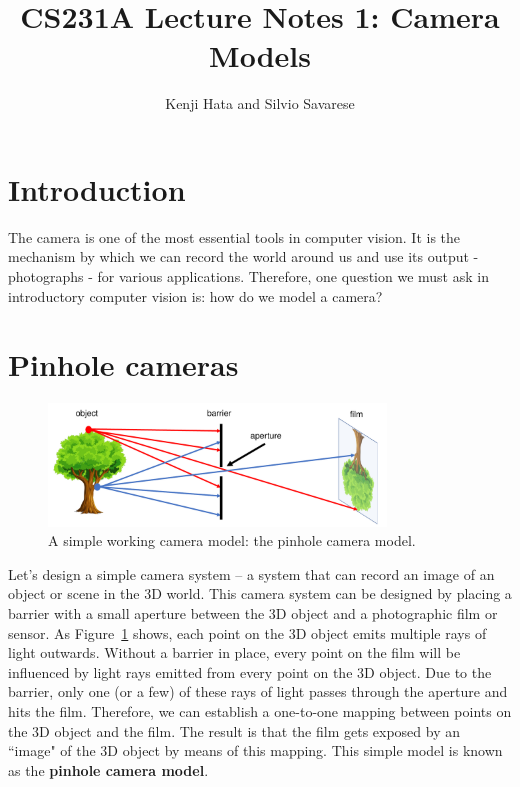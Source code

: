 \documentclass[a4paper, 12pt]{article}
\title{CS231A Lecture Notes 1: Camera Models}
\author{Kenji Hata and Silvio Savarese}
\date{}
\renewcommand\emph{\textbf}
\begin{document}
\maketitle

\section{Introduction}
The camera is one of the most essential tools in computer vision. It is the mechanism by which we can record the world around us and use its output - photographs - for various applications. Therefore, one question we must ask in introductory computer vision is: how do we model a camera?

\section{Pinhole cameras}
\begin{figure}[h!]
\centering
\includegraphics[width=0.8\textwidth]{figures/1-1.pdf}
\caption{A simple working camera model: the pinhole camera model.}
\label{fig:simpleCamera}
\end{figure}
Let's design a simple camera system -- a system that can record an image of an object or scene in the 3D world. This camera system can be designed by placing a barrier with a small aperture between the 3D object and a photographic film or sensor. As Figure~\ref{fig:simpleCamera} shows, each point on the 3D object emits multiple rays of light outwards. Without a barrier in place, every point on the film will be influenced by light rays emitted from every point on the 3D object. Due to the barrier, only one (or a few) of these rays of light passes through the aperture and hits the film. Therefore, we can establish a one-to-one mapping between points on the 3D object and the film. The result is that the film gets exposed by an ``image" of the 3D object by means of this mapping. This simple model is known as the \emph{pinhole camera model}.
\end{document}
